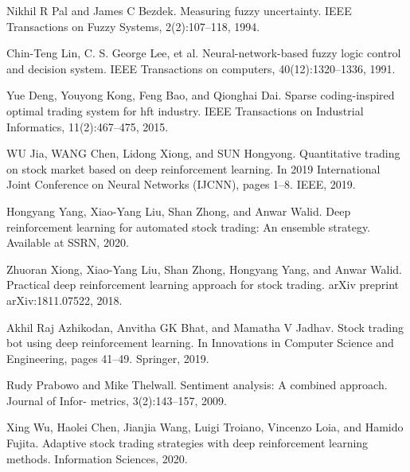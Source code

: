 \documentclass[a4paper,14pt]{extarticle}
\begin{document}
\begin{thebibliography}{0}
    \hypertarget{10}{}

	{Nikhil R Pal and James C Bezdek. Measuring fuzzy uncertainty. IEEE Transactions on Fuzzy Systems, 2(2):107–118, 1994.}

    \hypertarget{11}{}

	{Chin-Teng Lin, C. S. George Lee, et al. Neural-network-based fuzzy logic control and decision system. IEEE Transactions on computers, 40(12):1320–1336, 1991.}

    \hypertarget{12}{}

	{Yue Deng, Youyong Kong, Feng Bao, and Qionghai Dai. Sparse coding-inspired optimal trading system for hft industry. IEEE Transactions on Industrial Informatics, 11(2):467–475, 2015.}

    \hypertarget{13}{}

	{WU Jia, WANG Chen, Lidong Xiong, and SUN Hongyong. Quantitative trading on stock market based on deep reinforcement learning. In 2019 International Joint Conference on Neural Networks (IJCNN), pages 1–8. IEEE, 2019.}

    \hypertarget{14}{}

	{Hongyang Yang, Xiao-Yang Liu, Shan Zhong, and Anwar Walid. Deep reinforcement learning for automated stock trading: An ensemble strategy. Available at SSRN, 2020.}

    \hypertarget{15}{}
	{Zhuoran Xiong, Xiao-Yang Liu, Shan Zhong, Hongyang Yang, and Anwar Walid. Practical deep reinforcement learning approach for stock trading. arXiv preprint arXiv:1811.07522, 2018.}

    \hypertarget{16}{}

	{Akhil Raj Azhikodan, Anvitha GK Bhat, and Mamatha V Jadhav. Stock trading bot using deep reinforcement learning. In Innovations in Computer Science and Engineering, pages 41–49. Springer, 2019.}

    \hypertarget{17}{}

	{Rudy Prabowo and Mike Thelwall. Sentiment analysis: A combined approach. Journal of Infor- metrics, 3(2):143–157, 2009.}

    \hypertarget{18}{}

	{Xing Wu, Haolei Chen, Jianjia Wang, Luigi Troiano, Vincenzo Loia, and Hamido Fujita. Adaptive stock trading strategies with deep reinforcement learning methods. Information Sciences, 2020.}


\end{thebibliography}
\end{document}
